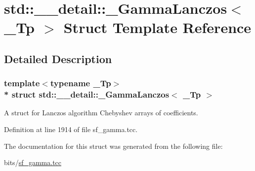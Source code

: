 \hypertarget{structstd_1_1____detail_1_1__GammaLanczos}{}\section{std\+:\+:\+\_\+\+\_\+detail\+:\+:\+\_\+\+Gamma\+Lanczos$<$ \+\_\+\+Tp $>$ Struct Template Reference}
\label{structstd_1_1____detail_1_1__GammaLanczos}


\subsection{Detailed Description}
\subsubsection*{template$<$typename \+\_\+\+Tp$>$\\*
struct std\+::\+\_\+\+\_\+detail\+::\+\_\+\+Gamma\+Lanczos$<$ \+\_\+\+Tp $>$}

A struct for Lanczos algorithm Chebyshev arrays of coefficients. 

Definition at line 1914 of file sf\+\_\+gamma.\+tcc.



The documentation for this struct was generated from the following file\+:\begin{DoxyCompactItemize}
\item 
bits/\hyperlink{sf__gamma_8tcc}{sf\+\_\+gamma.\+tcc}\end{DoxyCompactItemize}
